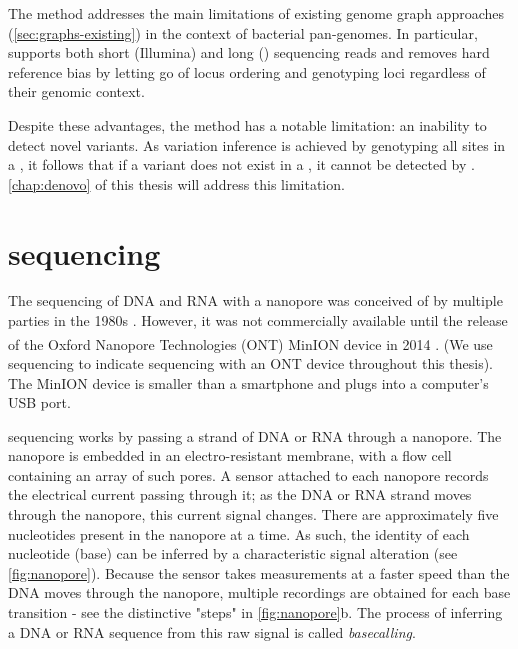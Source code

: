 \hspace{0.75cm}

\noindent
The \pandora{} method addresses the main limitations of existing genome graph approaches (\autoref{sec:graphs-existing}) in the context of bacterial pan-genomes. In particular, \pandora{} supports both short (Illumina) and long (\ont{}) sequencing reads and removes hard reference bias by letting go of locus ordering and genotyping loci regardless of their genomic context.

Despite these advantages, the method has a notable limitation: an inability to detect novel variants. As variation inference is achieved by genotyping all sites in a \prg{}, it follows that if a variant does not exist in a \prg{}, it cannot be detected by \pandora{}. \autoref{chap:denovo} of this thesis will address this limitation. 

\section{\ont{} sequencing}
\label{sec:intro-ont}
The sequencing of DNA and RNA with a nanopore was conceived of by multiple parties in the 1980s \cite{Deamer2016}. However, it was not commercially available until the release of the Oxford Nanopore Technologies (ONT) MinION\textsuperscript{\texttrademark} device in 2014 \cite{Quick2014,Deamer2016}. (We use \emph{\ont{}} sequencing to indicate sequencing with an ONT device throughout this thesis). The MinION device is smaller than a smartphone and plugs into a computer's USB port.

\ont{} sequencing works by passing a strand of DNA or RNA through a nanopore. The nanopore is embedded in an electro-resistant membrane, with a flow cell containing an array of such pores. A sensor attached to each nanopore records the electrical current passing through it; as the DNA or RNA strand moves through the nanopore, this current signal changes. There are approximately five nucleotides present in the nanopore at a time. As such, the identity of each nucleotide (base) can be inferred by a characteristic signal alteration (see \autoref{fig:nanopore}). Because the sensor takes measurements at a faster speed than the DNA moves through the nanopore, multiple recordings are obtained for each base transition - see the distinctive "steps" in \autoref{fig:nanopore}b. The process of inferring a DNA or RNA sequence from this raw signal is called \emph{basecalling}.

